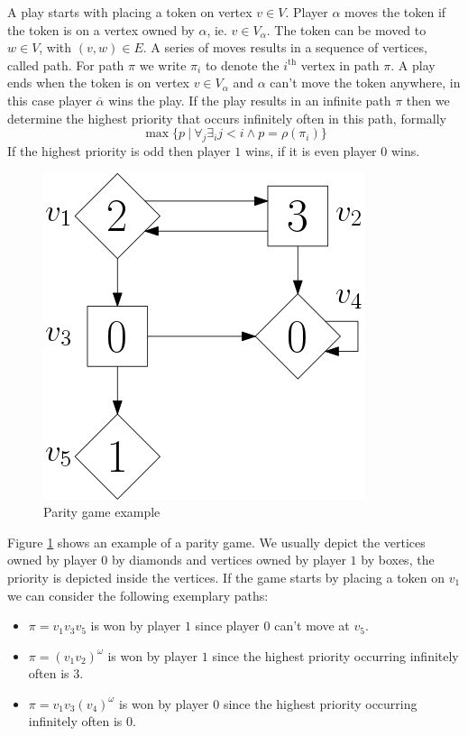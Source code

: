  A play starts with placing a token on vertex $v \in V$. Player $\alpha$ moves the token if the token is on a vertex owned by $\alpha$, ie. $v \in V_\alpha$. The token can be moved to $w \in V$, with $(v,w) \in E$. A series of moves results in a sequence of vertices, called path. For path $\pi$ we write $\pi_i$ to denote the $i^{\text{th}}$ vertex in path $\pi$. A play ends when the token is on vertex $v \in V_\alpha$ and $\alpha$ can't move the token anywhere, in this case player $\overline{\alpha}$ wins the play. If the play results in an infinite path $\pi$ then we determine the highest priority that occurs infinitely often in this path, formally
\[ \max\{ p \ |\ \forall_j \exists_i j < i \wedge p = \rho(\pi_i) \}\] 
If the highest priority is odd then player $1$ wins, if it is even player $0$ wins.
\begin{figure}[h]
	\centering
	\includegraphics[scale=0.3]{Examples/SimplePG/PG}
	\caption[Parity game example]{Parity game example}
	\label{fig:simplepgpg}
\end{figure}

Figure \ref{fig:simplepgpg} shows an example of a parity game. We usually depict the vertices owned by player $0$ by diamonds and vertices owned by player $1$ by boxes, the priority is depicted inside the vertices. If the game starts by placing a token on $v_1$ we can consider the following exemplary paths:
\begin{itemize}
	\item $\pi = v_1v_3v_5$ is won by player $1$ since player $0$ can't move at $v_5$.
	\item $\pi = (v_1v_2)^\omega$ is won by player $1$ since the highest priority occurring infinitely often is 3.
	\item $\pi = v_1v_3(v_4)^\omega$ is won by player $0$ since the highest priority occurring infinitely often is $0$.
\end{itemize}


